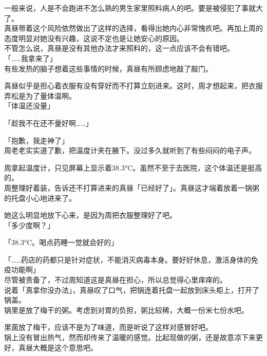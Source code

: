 一般来说，人是不会跑进不怎么熟的男生家里照料病人的吧。要是被侵犯了事就大了。\\

真昼带着这个风险依然做出了这样的选择，看得出她内心非常愧疚吧。再加上周的态度明显对她没有兴趣，这说不定也是让她安心的原因。\\

不管怎么说，真昼是没有其他办法才来照料的，这一点应该不会有错吧。\\

「……我拿来了」\\

有些发热的脑子想着这些事情的时候，真昼有所顾虑地敲了敲门。

真昼似乎是担心着衣服有没有穿好而不打算立刻进来。这时，周才想起来，把衣服弄松是为了量体温啊。\\

「体温还没量」

「趁我不在还不量好啊……」

「抱歉，我走神了」\\

周老老实实道了歉，把温度计夹在腋下。没过多久就听到了有些闷闷的电子声。

周拿起温度计，只见屏幕上显示着38.3°C。虽然不至于去医院，这个体温还是挺高的。\\

周整理好着装，告诉还不打算进来的真昼「已经好了」。真昼这才端着放着一锅粥的托盘小心地进来了。

她这么明显地放下心来，是因为周把衣服整理好了吧。\\

「多少度啊？」

「38.3°C。喝点药睡一觉就会好的」

「……药店的药都只是针对症状，不能消灭病毒本身。要好好休息，激活身体的免疫功能啊」\\

尽管被责备了，不过周知道这是真昼在担心，所以总觉得心里痒痒的。\\

说着「真拿你没办法」，真昼叹了口气，把锅连着托盘一起放到床头柜上，打开了锅盖。\\

锅里是放了梅干的粥。考虑到对胃的负担，粥比较稀，大概一份米七份水吧。

里面放了梅干，应该不是为了味道，而是听说了这样对感冒好吧。\\

锅上没有冒出热气，然而却传来了温暖的感觉。比起现做的粥，还是故意凉下来更好，真昼大概是这个意思吧。\\

